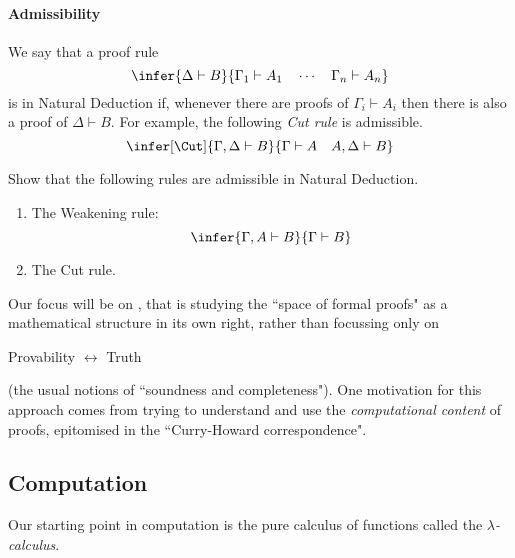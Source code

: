 \documentclass[12pt]{article}
\begin{document}
\paragraph{Admissibility}
We say that a proof rule
\[ \infer{\Delta\vdash B}{\Gamma_1\vdash A_1\quad\cdots\quad\Gamma_n\vdash A_n} \]
is  in Natural Deduction if, whenever there are proofs of $\Gamma_i\vdash A_i$ then there is also a proof of $\Delta\vdash B$. For example, the following \emph{Cut rule} is admissible.
\[ \infer[\Cut]{\Gamma,\Delta\vdash B}{\Gamma\vdash A\quad A,\Delta\vdash B} \]

\begin{myexercise}
Show that the following rules are admissible in Natural Deduction.
\begin{enumerate}
\item The Weakening rule:
\[ \infer{\Gamma,A\vdash B}{\Gamma\vdash B} \]
\item The Cut rule.
\end{enumerate}
\end{myexercise}
%
Our focus will be on , that is studying the ``space of formal proofs" as a mathematical structure in its own right,
rather than  focussing only on
\begin{center}
Provability $\longleftrightarrow$ Truth
\end{center}
(\ie the usual notions of ``soundness and completeness"). One motivation for this approach comes from trying to understand and use the
\emph{computational content} of proofs, epitomised in the ``Curry-Howard correspondence".

\subsection{Computation}
Our starting point in computation is the pure calculus of functions called the \emph{$\lambda$-calculus}.
\end{document}
